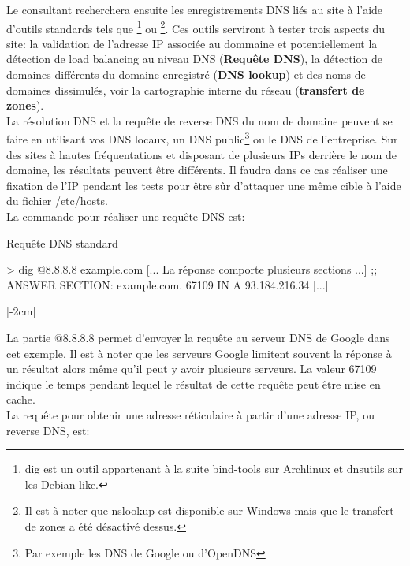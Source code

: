 \documentclass[twoside,a4paper,12pt,titlepage]{book}
\newcommand{\MarginPar}[2]{\marginnote{\scriptsize #1}[#2]}
\begin{document}
Le consultant recherchera ensuite les enregistrements \gls{DNS} liés au site à l'aide d'outils standards tels que \footnote{dig est un outil appartenant à la suite bind-tools sur Archlinux et dnsutils sur les Debian-like.} ou \footnote{Il est à noter que nslookup est disponible sur Windows mais que le transfert de zones a été désactivé dessus.}. Ces outils serviront à tester trois aspects du site: la validation de l'adresse IP associée au dommaine et potentiellement la détection de load balancing au niveau DNS (\textbf{Requête DNS}), la détection de domaines différents du domaine enregistré (\textbf{DNS lookup}) et des noms de domaines dissimulés, voir la cartographie interne du réseau (\textbf{transfert de zones}).\\
La résolution \gls{DNS}  et la requête de reverse DNS du nom de domaine peuvent se faire en utilisant vos DNS locaux, un DNS public\footnote{Par exemple les DNS de Google ou d'OpenDNS} ou le DNS de l'entreprise. Sur des sites à hautes fréquentations et disposant de plusieurs IPs derrière le nom de domaine, les résultats peuvent être différents. Il faudra dans ce cas réaliser une fixation de l'IP pendant les tests pour être sûr d'attaquer une même cible à l'aide du fichier /etc/hosts.\\
La commande  pour réaliser une requête DNS est:


\begin{Console}{Requête DNS standard}

> dig @8.8.8.8 example.com
[... La réponse comporte plusieurs sections ...]
;; ANSWER SECTION:
example.com.	67109 	IN	A	93.184.216.34
[...]

\end{Console}
\MarginPar{\textbf{Dig}: Requête DNS}{-2cm}

La partie @8.8.8.8 permet d'envoyer la requête au serveur \gls{DNS} de Google dans cet exemple. Il est à noter que les serveurs Google limitent souvent la réponse à un résultat alors même qu'il peut y avoir plusieurs serveurs. La valeur 67109 indique le temps pendant lequel le résultat de cette requête peut être mise en cache.\\
La requête pour obtenir une adresse réticulaire à partir d'une adresse IP, ou reverse DNS, est:
\end{document}
